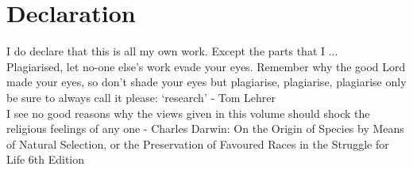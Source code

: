 \documentclass[12pt,titlepage,oneside]{book}
\begin{document}
\chapter{Declaration}
I do declare that this is all my own work. Except the parts that I ... \\ Plagiarised, let no-one else's work evade your eyes. Remember why the good Lord made your eyes, so don't shade your eyes but plagiarise, plagiarise, plagiarise only be sure to always call it please: `research' - Tom Lehrer\\

I see no good reasons why the views given in this volume should shock the religious feelings of any one - Charles Darwin: On the Origin of Species by Means of Natural Selection, or the Preservation of Favoured Races in the Struggle for Life 6th Edition

\singlespacing

\tableofcontents
\cleardoublepage

{}
\listoffigures
\cleardoublepage

{}
\listoftables

\doublespacing
\end{document}
